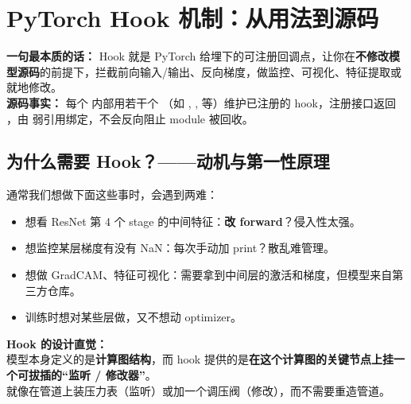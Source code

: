 
\section{PyTorch Hook 机制：从用法到源码}

\begin{conceptbox}
\textbf{一句最本质的话：} Hook 就是 PyTorch 给埋下的可注册回调点，让你在\textbf{不修改模型源码}的前提下，拦截前向输入/输出、反向梯度，做监控、可视化、特征提取或就地修改。\\
\textbf{源码事实：} 每个  内部用若干个 （如 , ,  等）维护已注册的 hook，注册接口返回 ，由  弱引用绑定，不会反向阻止 module 被回收。
\end{conceptbox}

\subsection{为什么需要 Hook？——动机与第一性原理}

通常我们想做下面这些事时，会遇到两难：

\begin{itemize}[leftmargin=1.5em]
  \item 想看 ResNet 第 4 个 stage 的中间特征：\textbf{改 forward}？侵入性太强。
  \item 想监控某层梯度有没有 NaN：每次手动加 print？散乱难管理。
  \item 想做 GradCAM、特征可视化：需要拿到中间层的激活和梯度，但模型来自第三方仓库。
  \item 训练时想对某些层做，又不想动 optimizer。
\end{itemize}

\begin{intubox}
\textbf{Hook 的设计直觉：}\\
模型本身定义的是\textbf{计算图结构}，而 hook 提供的是\textbf{在这个计算图的关键节点上挂一个可拔插的“监听 / 修改器”}。\\
就像在管道上装压力表（监听）或加一个调压阀（修改），而不需要重造管道。
\end{intubox}

